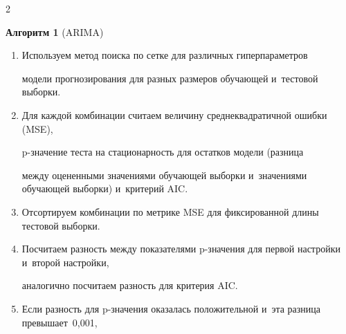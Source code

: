 \begin{multicols}{2}
\ %






\vspace*{2pt}



\textbf{Алгоритм 1} (ARIMA) %

    

        \noindent

        \begin{enumerate}[1.]



       

        \item

        Используем метод поиска по сетке для различных гиперпараметров 

        модели прогнозирования для разных размеров обучающей и~тестовой выборки.

        

        \item

        Для каждой комбинации считаем величину среднеквадратичной ошибки (MSE), 

        p-зна\-че\-ние теста на стационарность для остатков модели (разница 

        между оцененными значениями обучающей выборки и~значениями обучающей выборки) и~критерий AIC.

        

        

        \item

        Отсортируем комбинации по метрике MSE для фиксированной длины тестовой выборки.

        \item

        

        Посчитаем разность между показателями \mbox{p-зна}\-че\-ния для первой настройки и~второй настройки, 

        аналогично посчитаем разность для критерия AIC.

        

        

        \item

        Если разность для p-зна\-че\-ния оказалась положительной и~эта разница превышает~0,001, 


\end{enumerate}
\end{multicols}
